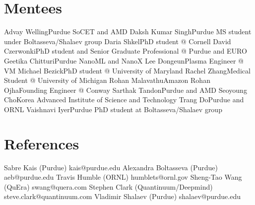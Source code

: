\section{Mentees}
  \resumeSubHeadingListStart
    \resumeSubheadingSimple
      {Advay Welling}{Purdue SoCET and AMD}
    \resumeSubheadingSimple
      {Daksh Kumar Singh}{Purdue MS student under Boltasseva/Shalaev group}
    \resumeSubheadingSimple
      {Daria Shkel}{PhD student @ Cornell}
    \resumeSubheadingSimple
      {David Czerwonki}{PhD student and Senior Graduate Professional @ Purdue and EURO}
    \resumeSubheadingSimple
      {Geetika Chitturi}{Purdue NanoML and NanoX}
    \resumeSubheadingSimple
      {Lee Dongeun}{Plasma Engineer @ VM}
    \resumeSubheadingSimple
      {Michael Bezick}{PhD student @ University of Maryland}
    \resumeSubheadingSimple
      {Rachel Zhang}{Medical Student @ University of Michigan}
    \resumeSubheadingSimple
      {Rohan Malavathu}{Amazon}
    \resumeSubheadingSimple
      {Rohan Ojha}{Founding Engineer @ Conway}
    \resumeSubheadingSimple
      {Sarthak Tandon}{Purdue and AMD}
    \resumeSubheadingSimple
      {Seoyoung Cho}{Korea Advanced Institute of Science and Technology}
    \resumeSubheadingSimple
      {Trang Do}{Purdue and ORNL}
    \resumeSubheadingSimple
      {Vaishnavi Iyer}{Purdue PhD student at Boltasseva/Shalaev group}
  \resumeSubHeadingListEnd
\section{References}
  \resumeSubHeadingListStart
    \resumeSubheading
      {Sabre Kais (Purdue)}{}
      {kais@purdue.edu}{}
    \resumeSubheading
      {Alexandra Boltasseva (Purdue)}{}
      {aeb@purdue.edu}{}
    \resumeSubheading
      {Travis Humble (ORNL)}{}
      {humblets@ornl.gov}{}
    \resumeSubheading
      {Sheng-Tao Wang (QuEra)}{}
      {swang@quera.com}{}
    \resumeSubheading
      {Stephen Clark (Quantinuum/Deepmind)}{}
      {steve.clark@quantinuum.com}{}
    \resumeSubheading
      {Vladimir Shalaev (Purdue)}{}
      {shalaev@purdue.edu}{}
  \resumeSubHeadingListEnd
